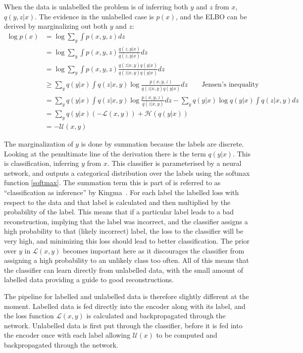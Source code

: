 \documentclass[12pt,a4paper,twoside,openright]{report}
\begin{document}
When the data is unlabelled the problem is of inferring both $y$ and $z$ from $x$, $q(y, z|x)$. The evidence in the unlabelled case is $p(x)$,
and the ELBO can be derived by marginalizing out both $y$ and $z$:
\begingroup
\allowdisplaybreaks
\begin{align*}
  \log p(x) & = \log \sum_{y} \int p(x, y, z) dz \\
  & = \log \sum_{y} \int p(x, y, z) \frac{q(z, y|x)}{q(z, y|x)} dz\\
  & = \log \sum_{y} \int p(x, y, z) \frac{q(z|x, y)q(y|x)}{q(z|x, y)q(y|x)} dz\\
  & \geq \sum_{y} q(y|x) \int q(z|x, y) \log\frac{p(x, y, z)}{q(z|x, y)q(y|x)} dz \qquad \text{Jensen's inequality}\\
  & = \sum_{y} q(y|x) \int q(z|x, y) \log\frac{p(x, y, z)}{q(z|x, y)} dz - \sum_{y} q(y|x) \log q(y|x) \int q(z|x, y) dz\\
  & = \sum_{y} q(y|x)(-\mathcal{L}(x, y)) + \mathcal{H}(q(y|x)) \\
  & = -\mathcal{U}(x, y)
\end{align*}
\endgroup

The marginalization of $y$ is done by summation because the labels are discrete. Looking at the penultimate line of the derivation there is
the term $q(y|x)$. This is classification, inferring $y$ from $x$. This classifier is parameterised
by a neural network, and outputs a categorical distribution over the labels using the softmax function \eqref{softmax}. The summation term 
this is part of is referred to as ``classification as inference'' by Kingma~\cite{DBLP:journals/corr/KingmaRMW14}. For each label the labelled loss with 
respect to the data and that label is calculated and then multiplied by the probability of the label. This means that if a particular label
leads to a bad reconstruction, implying that the label was incorrect, and the classifier assigns a high probability to that (likely incorrect) label, 
the loss to the classifier will be very high, and minimizing this loss should lead to better classification. The prior over $y$ in $\mathcal{L}(x, y)$
becomes important here as it discourages the classifier from assigning a high probability to an unlikely class too often. All of this means that 
the classifier can learn directly from unlabelled data, with the small amount of labelled data providing a guide to good reconstructions.

The pipeline for labelled and unlabelled data is therefore slightly different at the moment. Labelled data is fed directly into the encoder
along with its label, and the loss function $\mathcal{L}(x, y)$ is calculated and backpropagated through the network. Unlabelled data is 
first put through the classifier, before it is fed into the encoder once with each label allowing $\mathcal{U}(x)$ to be computed and 
backpropagated through the network.
\end{document}
